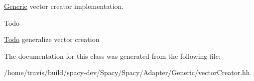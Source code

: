\hyperlink{namespaceSpacy_1_1Generic}{\-Generic} vector creator implementation. 

\begin{DoxyRefDesc}{\-Todo}
\item[\hyperlink{todo__todo000001}{\-Todo}]generalize vector creation \end{DoxyRefDesc}


\-The documentation for this class was generated from the following file\-:\begin{DoxyCompactItemize}
\item 
/home/travis/build/spacy-\/dev/\-Spacy/\-Spacy/\-Adapter/\-Generic/vector\-Creator.\-hh\end{DoxyCompactItemize}

